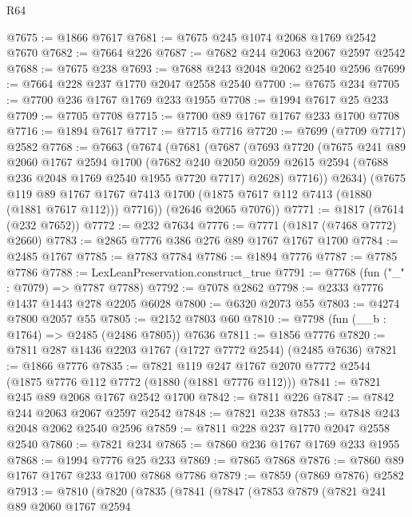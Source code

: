 \begin{lexlean}{R64}
\begin{coremodule}
@7675 := @1866 @7617
@7681 := @7675 @245 @1074 @2068 @1769 @2542 @7670
@7682 := @7664 @226
@7687 := @7682 @244 @2063 @2067 @2597 @2542
@7688 := @7675 @238
@7693 := @7688 @243 @2048 @2062 @2540 @2596
@7699 := @7664 @228 @237 @1770 @2047 @2558 @2540
@7700 := @7675 @234
@7705 := @7700 @236 @1767 @1769 @233 @1955
@7708 := @1994 @7617 @25 @233
@7709 := @7705 @7708
@7715 := @7700 @89 @1767 @1767 @233 @1700 @7708
@7716 := @1894 @7617
@7717 := @7715 @7716
@7720 := @7699 (@7709 @7717) @2582
@7768 := @7663
    (@7674
      (@7681
        (@7687
          (@7693
            @7720
            (@7675
              @241
              @89
              @2060
              @1767
              @2594
              @1700
              (@7682
                @240
                @2050
                @2059
                @2615
                @2594
                (@7688 @236 @2048 @1769 @2540 @1955 @7720 @7717)
                @2628)
              @7716))
          @2634)
        (@7675
          @119
          @89
          @1767
          @1767
          @7413
          @1700
          (@1875 @7617 @112 @7413 (@1880 (@1881 @7617 @112)))
          @7716))
      (@2646 @2065 @7076))
@7771 := @1817 (@7614 (@232 @7652))
@7772 := @232 @7634
@7776 := @7771 (@1817 (@7468 @7772) @2660)
@7783 := @2865 @7776 @386 @276 @89 @1767 @1767 @1700
@7784 := @2485 @1767
@7785 := @7783 @7784
@7786 := @1894 @7776
@7787 := @7785 @7786
@7788 := LexLeanPreservation.construct_true
@7791 := @7768 (fun ("_" : @7079) => @7787 @7788)
@7792 := @7078 @2862
@7798 := @2333 @7776 @1437 @1443 @278 @2205 @6028
@7800 := @6320 @2073 @55
@7803 := @4274 @7800 @2057 @55
@7805 := @2152 @7803 @60
@7810 := @7798 (fun (__b : @1764) => @2485 (@2486 @7805)) @7636
@7811 := @1856 @7776
@7820 := @7811 @287 @1436 @2203 @1767 (@1727 @7772 @2544) (@2485 @7636)
@7821 := @1866 @7776
@7835 := @7821 @119 @247 @1767 @2070 @7772 @2544 (@1875 @7776 @112 @7772 (@1880 (@1881 @7776 @112)))
@7841 := @7821 @245 @89 @2068 @1767 @2542 @1700
@7842 := @7811 @226
@7847 := @7842 @244 @2063 @2067 @2597 @2542
@7848 := @7821 @238
@7853 := @7848 @243 @2048 @2062 @2540 @2596
@7859 := @7811 @228 @237 @1770 @2047 @2558 @2540
@7860 := @7821 @234
@7865 := @7860 @236 @1767 @1769 @233 @1955
@7868 := @1994 @7776 @25 @233
@7869 := @7865 @7868
@7876 := @7860 @89 @1767 @1767 @233 @1700 @7868 @7786
@7879 := @7859 (@7869 @7876) @2582
@7913 := @7810
    (@7820
      (@7835
        (@7841
          (@7847
            (@7853
              @7879
              (@7821
                @241
                @89
                @2060
                @1767
                @2594

\end{coremodule}
\end{lexlean}
